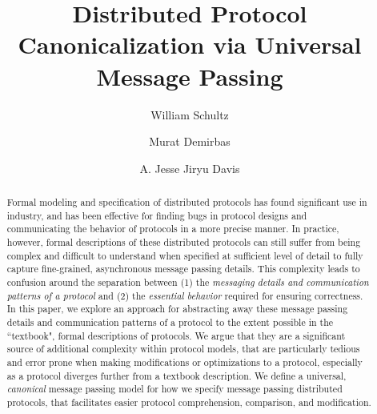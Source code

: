 \documentclass[acmsmall,screen,review]{acmart}
\begin{document}
\tikzset{>=latex}

\newcommand{\todo}[1]{\textcolor{red}{TODO: #1}}


\newcommand{\pardesc}[1]{}



\title{Distributed Protocol Canonicalization via Universal Message Passing}

\author{William Schultz}

\author{Murat Demirbas}

\author{A. Jesse Jiryu Davis}

\begin{abstract}
    Formal modeling and specification of distributed protocols has found significant use in industry, and has been effective for finding bugs in protocol designs and communicating the behavior of protocols in a more precise manner. In practice, however, formal descriptions of these distributed protocols can still suffer from being complex and difficult to understand when specified at sufficient level of detail to fully capture fine-grained, asynchronous message passing details. This complexity leads to confusion around the separation between (1) the \emph{messaging details and communication patterns of a protocol} and (2) the \emph{essential behavior} required for ensuring correctness.
    In this paper, we explore an approach for abstracting away these message passing details and communication patterns of a protocol to the extent possible in the ``textbook", formal descriptions of protocols. We argue that they are a significant source of additional complexity within protocol models, that are particularly tedious and error prone when making modifications or optimizations to a protocol, especially as a protocol diverges further from a textbook description. We define a universal, \emph{canonical} message passing model for how we specify message passing distributed protocols, that facilitates easier protocol comprehension, comparison, and modification.
\end{abstract}
\end{document}
